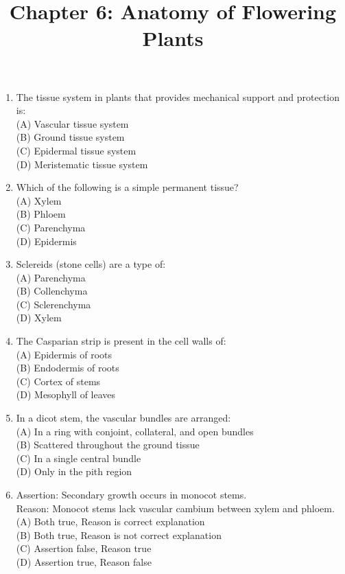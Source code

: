 \documentclass{article}
\begin{document}
\title{Chapter 6: Anatomy of Flowering Plants}
\date{}
\maketitle

\begin{enumerate}[label=Q\arabic*.]

\item The tissue system in plants that provides mechanical support and protection is:
\\(A) Vascular tissue system
\\(B) Ground tissue system
\\(C) Epidermal tissue system
\\(D) Meristematic tissue system

\item Which of the following is a simple permanent tissue?
\\(A) Xylem
\\(B) Phloem
\\(C) Parenchyma
\\(D) Epidermis

\item Sclereids (stone cells) are a type of:
\\(A) Parenchyma
\\(B) Collenchyma
\\(C) Sclerenchyma
\\(D) Xylem

\item The Casparian strip is present in the cell walls of:
\\(A) Epidermis of roots
\\(B) Endodermis of roots
\\(C) Cortex of stems
\\(D) Mesophyll of leaves

\item In a dicot stem, the vascular bundles are arranged:
\\(A) In a ring with conjoint, collateral, and open bundles
\\(B) Scattered throughout the ground tissue
\\(C) In a single central bundle
\\(D) Only in the pith region

\item Assertion: Secondary growth occurs in monocot stems.\\
Reason: Monocot stems lack vascular cambium between xylem and phloem.
\\(A) Both true, Reason is correct explanation
\\(B) Both true, Reason is not correct explanation
\\(C) Assertion false, Reason true
\\(D) Assertion true, Reason false


\end{enumerate}
\end{document}
